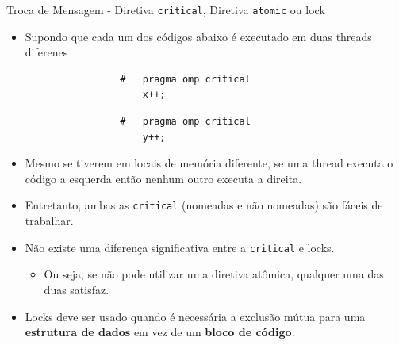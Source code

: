 	\begin{frame}[fragile]{Troca de Mensagem - Diretiva {\tt critical}, Diretiva {\tt atomic} ou lock}
		\begin{itemize}
			\item Supondo que cada um dos códigos abaixo é executado em duas threads diferenes
		\end{itemize}

		\begin{multicols}{2}
				\begin{verbatim}
					#	pragma omp critical
						x++;
				\end{verbatim}
		\columnbreak
				\begin{verbatim}
					#	pragma omp critical
						y++;
				\end{verbatim}
		\end{multicols}
		\begin{itemize}
			\item Mesmo se tiverem em locais de memória diferente, se uma thread executa o código a esquerda então nenhum outro executa a direita.
			\item Entretanto, ambas as {\tt critical} (nomeadas e não nomeadas) são fáceis de trabalhar.
			\item Não existe uma diferença significativa entre a {\tt critical} e locks.
			\begin{itemize}
				\item Ou seja, se não pode utilizar uma diretiva atômica, qualquer uma das duas satisfaz.
			\end{itemize}
					\bigskip
			\item Locks deve ser usado quando é necessária a exclusão mútua para uma \textbf{estrutura de dados} em vez de um \textbf{bloco de código}.
		\end{itemize}
\end{frame}

